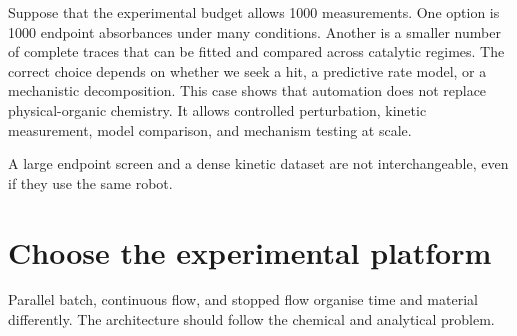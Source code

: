 

Suppose that the experimental budget allows 1000 measurements.
One option is 1000 endpoint absorbances under many conditions.
Another is a smaller number of complete traces that can be fitted and compared across catalytic regimes.
The correct choice depends on whether we seek a hit, a predictive rate model, or a mechanistic decomposition.
This case shows that automation does not replace physical-organic chemistry.
It allows controlled perturbation, kinetic measurement, model comparison, and mechanism testing at scale.

\begin{conceptbox}
  A large endpoint screen and a dense kinetic dataset are not interchangeable, even if they use the same robot.
\end{conceptbox}

\section{Choose the experimental platform}

Parallel batch, continuous flow, and stopped flow organise time and material differently.
The architecture should follow the chemical and analytical problem.

